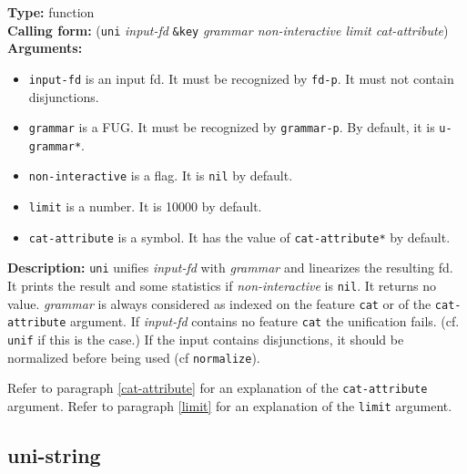 \documentclass[10pt,a4paper]{report}
\begin{document}
{\bf Type:} function
\\{\bf Calling form:} ({\tt uni} {\em input-fd} {\tt \&key} {\em grammar
non-interactive limit cat-attribute})
\\{\bf Arguments:} 
\begin{itemize}
\item {\tt input-fd} is an input fd. It must be recognized by {\tt fd-p}.  It must
not contain disjunctions.  

\item {\tt grammar} is a FUG. It must be recognized by {\tt grammar-p}. By
default, it is {\tt *u-grammar*}.

\item {\tt non-interactive} is a flag. It is {\tt nil} by default.

\item {\tt limit} is a number.  It is 10000 by default.

\item {\tt cat-attribute} is a symbol.  It has the value of {\tt *cat-attribute*} by
default. 
\end{itemize}

{\bf Description:} {\tt uni} unifies {\em input-fd} with {\em grammar} and
linearizes the resulting fd. It prints the result and some statistics if
{\em non-interactive} is {\tt nil}. It returns no value. {\em grammar} is always
considered as indexed on the feature {\tt cat} or of the {\tt cat-attribute}
argument. If {\em input-fd} contains no feature {\tt cat} the unification
fails. (cf. {\tt unif} if this is the case.)  If the input contains
disjunctions, it should be normalized before being used (cf {\tt normalize}).

Refer to paragraph \ref{cat-attribute} for an explanation of the
{\tt cat-attribute} argument.
Refer to paragraph \ref{limit} for an explanation of the {\tt limit} argument.


\subsection{uni-string}
\end{document}
